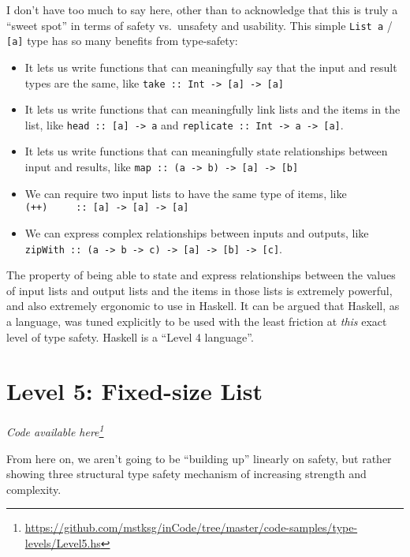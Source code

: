 \documentclass[]{article}
\renewcommand{\href}[2]{#2\footnote{\url{#1}}}
\begin{document}
I don't have too much to say here, other than to acknowledge that this is truly
a ``sweet spot'' in terms of safety vs.~unsafety and usability. This simple
\texttt{List\ a} / \texttt{{[}a{]}} type has so many benefits from type-safety:

\begin{itemize}
\tightlist
\item
  It lets us write functions that can meaningfully say that the input and result
  types are the same, like
  \texttt{take\ ::\ Int\ -\textgreater{}\ {[}a{]}\ -\textgreater{}\ {[}a{]}}
\item
  It lets us write functions that can meaningfully link lists and the items in
  the list, like \texttt{head\ ::\ {[}a{]}\ -\textgreater{}\ a} and
  \texttt{replicate\ ::\ Int\ -\textgreater{}\ a\ -\textgreater{}\ {[}a{]}}.
\item
  It lets us write functions that can meaningfully state relationships between
  input and results, like
  \texttt{map\ ::\ (a\ -\textgreater{}\ b)\ -\textgreater{}\ {[}a{]}\ -\textgreater{}\ {[}b{]}}
\item
  We can require two input lists to have the same type of items, like
  \texttt{(++)\ \ \ \ \ ::\ {[}a{]}\ -\textgreater{}\ {[}a{]}\ -\textgreater{}\ {[}a{]}}
\item
  We can express complex relationships between inputs and outputs, like
  \texttt{zipWith\ ::\ (a\ -\textgreater{}\ b\ -\textgreater{}\ c)\ -\textgreater{}\ {[}a{]}\ -\textgreater{}\ {[}b{]}\ -\textgreater{}\ {[}c{]}}.
\end{itemize}

The property of being able to state and express relationships between the values
of input lists and output lists and the items in those lists is extremely
powerful, and also extremely ergonomic to use in Haskell. It can be argued that
Haskell, as a language, was tuned explicitly to be used with the least friction
at \emph{this} exact level of type safety. Haskell is a ``Level 4 language''.

\section{Level 5: Fixed-size List}\label{level-5-fixed-size-list}

\emph{\href{https://github.com/mstksg/inCode/tree/master/code-samples/type-levels/Level5.hs}{Code
available here}}

From here on, we aren't going to be ``building up'' linearly on safety, but
rather showing three structural type safety mechanism of increasing strength and
complexity.
\end{document}
